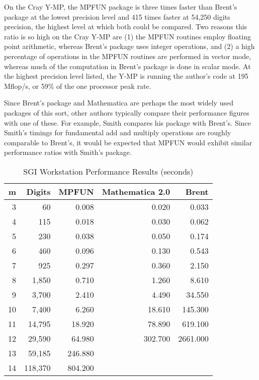 On the Cray Y-MP, the MPFUN package is three times faster than Brent's
package at the lowest precision level and 415 times faster at 54,250
digits precision, the highest level at which both could be compared.
Two reasons this ratio is so high on the Cray Y-MP are (1) the MPFUN
routines employ floating point arithmetic, whereas Brent's package
uses integer operations, and (2) a high percentage of operations in
the MPFUN routines are performed in vector mode, whereas much of the
computation in Brent's package is done in scalar mode.  At the highest
precision level listed, the Y-MP is running the author's code at 195
Mflop/s, or 59\% of the one processor peak rate.

Since Brent's package and Mathematica are perhaps the most widely used
packages of this sort, other authors typically compare their
performance figures with one of these.  For example, Smith
\cite{smith} compares his package with Brent's.  Since Smith's timings
for fundamental add and multiply operations are roughly comparable to
Brent's, it would be expected that MPFUN would exhibit similar
performance ratios with Smith's package.

\begin{table}[p] \begin{center} \begin{tabular}{|r|r|r|r|r|}
\hline
 m  & Digits  &   MPFUN  &  Mathematica 2.0 &   Brent \\
\hline
 3  &        60 &    0.008 &    0.020  &    0.033 \\
 4  &       115 &    0.018 &    0.030  &    0.062 \\
 5  &       230 &    0.038 &    0.050  &    0.174 \\
 6  &       460 &    0.096 &    0.130  &    0.543 \\
 7  &       925 &    0.297 &    0.360  &    2.150 \\
 8  &     1,850 &    0.710 &    1.260  &    8.610 \\
 9  &     3,700 &    2.410 &    4.490  &   34.550 \\
10  &     7,400 &    6.260 &   18.610  &  145.300 \\
11  &    14,795 &   18.920 &   78.890  &  619.100 \\
12  &    29,590 &   64.980 &  302.700  & 2661.000 \\
13  &    59,185 &  246.880 &           &          \\
14  &   118,370 &  804.200 &           &          \\
\hline
\end{tabular}
\caption{SGI Workstation Performance Results (seconds)}
\end{center} \end{table}

